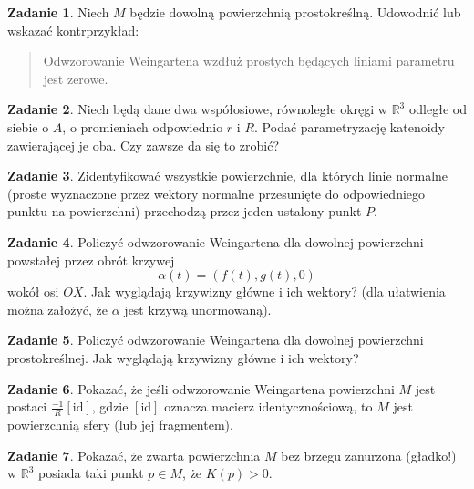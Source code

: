 \documentclass[a4paper,11pt]{article}
\theoremstyle{definition}\newtheorem{exercise}{Zadanie}
\theoremstyle{definition}\newtheorem{remark}{Uwaga}
\begin{document}
\begin{exercise}
Niech $M$ będzie dowolną powierzchnią prostokreślną. Udowodnić lub wskazać 
kontrprzykład: 
\begin{quote}
Odwzorowanie Weingartena wzdłuż prostych będących liniami parametru jest 
zerowe. 
\end{quote}

\end{exercise}






\begin{exercise}
Niech będą dane dwa współosiowe, równoległe okręgi w $\mathbb{R}^3$ odległe od siebie o $A$, o promieniach odpowiednio $r$ i $R$. Podać parametryzację katenoidy zawierającej je oba. Czy zawsze da się to zrobić?
\end{exercise}


\begin{exercise}
Zidentyfikować wszystkie powierzchnie, dla których linie normalne (proste 
wyznaczone przez wektory normalne przesunięte do odpowiedniego punktu na 
powierzchni) przechodzą przez jeden ustalony punkt $P$.
\end{exercise}

\begin{exercise}
Policzyć odwzorowanie Weingartena dla dowolnej powierzchni powstałej przez obrót krzywej \[\alpha(t)=(f(t),g(t),0)\] wokół osi $OX$. Jak wyglądają krzywizny główne i ich wektory? (dla ułatwienia można założyć, że $\alpha$ jest krzywą unormowaną).
\end{exercise}

\begin{exercise}
Policzyć odwzorowanie Weingartena dla dowolnej powierzchni prostokreślnej. Jak wyglądają krzywizny główne i ich wektory?
\end{exercise}

\begin{exercise}
Pokazać, że jeśli odwzorowanie Weingartena powierzchni $M$ jest postaci $\frac{-1	}{R}[\text{id}]$, gdzie $[\text{id}]$ oznacza macierz identycznościową, to $M$ jest powierzchnią sfery (lub jej fragmentem).
\end{exercise}

\begin{exercise}
 Pokazać, że zwarta powierzchnia $M$ bez brzegu zanurzona (gładko!) w 
$\mathbb{R}^3$ posiada taki punkt $p\in M$, że $K(p)> 0$.
\end{exercise}
\end{document}
